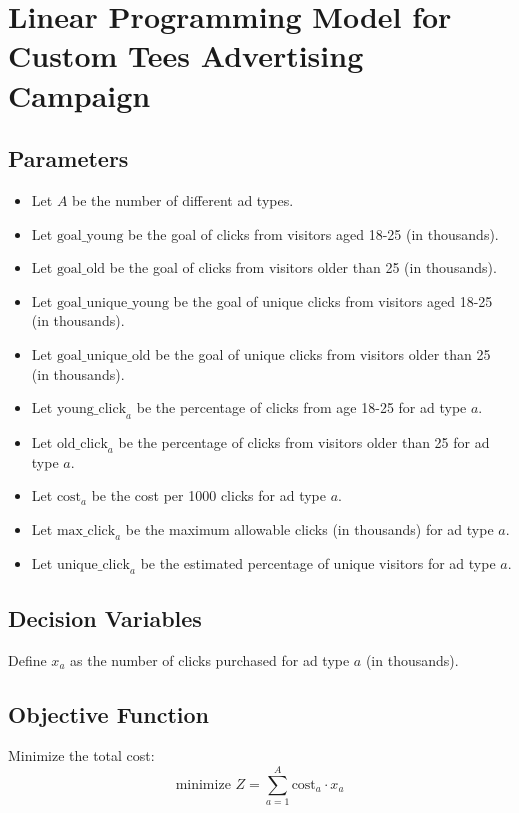 \documentclass{article}
\begin{document}
\section*{Linear Programming Model for Custom Tees Advertising Campaign}

\subsection*{Parameters}
\begin{itemize}
    \item Let \( A \) be the number of different ad types.
    \item Let \( \text{goal\_young} \) be the goal of clicks from visitors aged 18-25 (in thousands).
    \item Let \( \text{goal\_old} \) be the goal of clicks from visitors older than 25 (in thousands).
    \item Let \( \text{goal\_unique\_young} \) be the goal of unique clicks from visitors aged 18-25 (in thousands).
    \item Let \( \text{goal\_unique\_old} \) be the goal of unique clicks from visitors older than 25 (in thousands).
    \item Let \( \text{young\_click}_a \) be the percentage of clicks from age 18-25 for ad type \( a \).
    \item Let \( \text{old\_click}_a \) be the percentage of clicks from visitors older than 25 for ad type \( a \).
    \item Let \( \text{cost}_a \) be the cost per 1000 clicks for ad type \( a \).
    \item Let \( \text{max\_click}_a \) be the maximum allowable clicks (in thousands) for ad type \( a \).
    \item Let \( \text{unique\_click}_a \) be the estimated percentage of unique visitors for ad type \( a \).
\end{itemize}

\subsection*{Decision Variables}
Define \( x_a \) as the number of clicks purchased for ad type \( a \) (in thousands).

\subsection*{Objective Function}
Minimize the total cost:
\[
\text{minimize } Z = \sum_{a=1}^{A} \text{cost}_a \cdot x_a
\]
\end{document}
